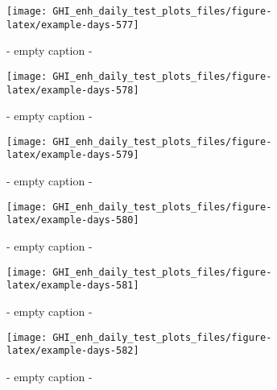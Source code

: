 \documentclass[
  10pt,
  a4paper,oneside]{article}
\begin{document}
\begin{figure}[H]

{\centering \texttt{[image: GHI\_enh\_daily\_test\_plots\_files/figure-latex/example-days-577]} 

}

\caption{ - empty caption - }\label{fig:example-days-577}
\end{figure}

\begin{figure}[H]

{\centering \texttt{[image: GHI\_enh\_daily\_test\_plots\_files/figure-latex/example-days-578]} 

}

\caption{ - empty caption - }\label{fig:example-days-578}
\end{figure}

\begin{figure}[H]

{\centering \texttt{[image: GHI\_enh\_daily\_test\_plots\_files/figure-latex/example-days-579]} 

}

\caption{ - empty caption - }\label{fig:example-days-579}
\end{figure}

\begin{figure}[H]

{\centering \texttt{[image: GHI\_enh\_daily\_test\_plots\_files/figure-latex/example-days-580]} 

}

\caption{ - empty caption - }\label{fig:example-days-580}
\end{figure}

\begin{figure}[H]

{\centering \texttt{[image: GHI\_enh\_daily\_test\_plots\_files/figure-latex/example-days-581]} 

}

\caption{ - empty caption - }\label{fig:example-days-581}
\end{figure}

\begin{figure}[H]

{\centering \texttt{[image: GHI\_enh\_daily\_test\_plots\_files/figure-latex/example-days-582]} 

}

\caption{ - empty caption - }\label{fig:example-days-582}
\end{figure}
\end{document}
